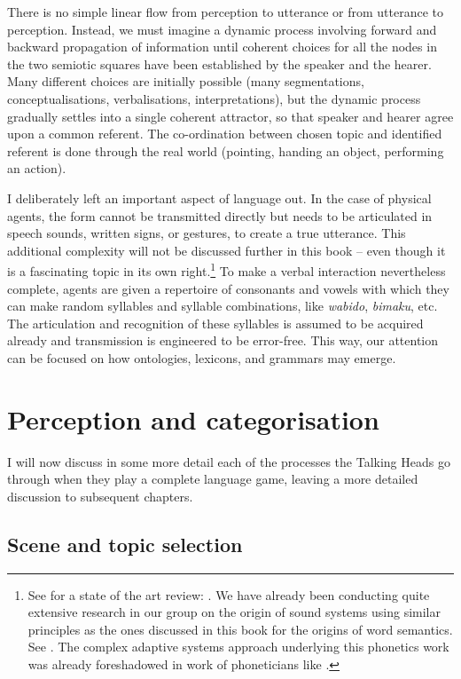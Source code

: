 There is no simple linear flow from perception to utterance 
or from utterance to perception. Instead, we must imagine a dynamic process 
involving forward and backward propagation of information 
until coherent choices for all the nodes in the two
semiotic squares have been established by the speaker and 
the hearer. Many different choices are initially possible 
(many segmentations, conceptualisations, verbalisations, 
interpretations), but the dynamic process gradually settles into 
a single coherent attractor, so that speaker and hearer 
agree upon a common referent. The co-ordination between 
chosen topic and identified referent is done through 
the real world (pointing, handing an object, performing
an action). 

I deliberately left an important aspect of language out. 
In the case of physical agents, the form cannot be transmitted
directly but needs to be articulated in speech sounds, 
written signs, or gestures, to create a true utterance. This additional 
complexity will not be discussed further in this book -- even though 
it is a fascinating topic in its own right.\footnote{See for a state of the art review: \cite{Clark:1990}. 
We have already been conducting quite extensive 
research in our group on the origin of sound systems 
using similar principles as the ones discussed in this 
book for the origins of word semantics. 
See  \cite{DeBoer:1997}. The complex 
adaptive systems approach underlying this phonetics
work was already foreshadowed in work of phoneticians
like \cite{Liljencrants:1972}.}
To make a verbal interaction nevertheless complete, agents
are given a repertoire of consonants and vowels with 
which they can make random syllables and syllable combinations, 
like \textit{wabido}, \textit{bimaku}, etc. The articulation and 
recognition of these syllables is assumed to be acquired
already and transmission is engineered to be error-free. 
This way, our attention can be focused on how
ontologies, lexicons, and grammars may emerge. 

\section{Perception and categorisation}

I will now discuss in some more detail each of the processes
the Talking Heads go through when they 
play a complete language game, leaving a more detailed 
discussion to subsequent chapters.

\subsection{Scene and topic selection}

